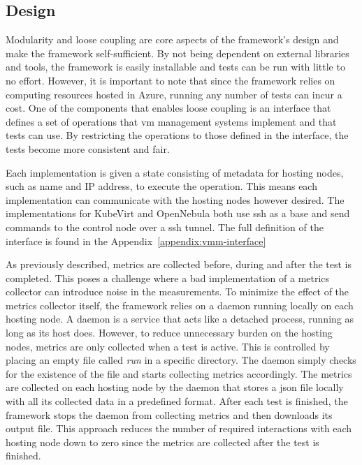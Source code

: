 \documentclass{kththesis}
\begin{document}
\subsection{Design}
\label{sec:framework-design}
Modularity and loose coupling are core aspects of the framework's design and make the framework self-sufficient. By not being dependent on external libraries and tools, the framework is easily installable and tests can be run with little to no effort. However, it is important to note that since the framework relies on computing resources hosted in Azure, running any number of tests can incur a cost. One of the components that enables loose coupling is an interface that defines a set of operations that \Gls{vm} management systems implement and that tests can use. By restricting the operations to those defined in the interface, the tests become more consistent and fair. 

Each implementation is given a state consisting of metadata for hosting nodes, such as name and IP address, to execute the operation. This means each implementation can communicate with the hosting nodes however desired. The implementations for KubeVirt and OpenNebula both use \Gls{ssh} as a base and send commands to the control node over a \Gls{ssh} tunnel. The full definition of the interface is found in the Appendix\ \ref{appendix:vmm-interface}

As previously described, metrics are collected before, during and after the test is completed. This poses a challenge where a bad implementation of a metrics collector can introduce noise in the measurements. To minimize the effect of the metrics collector itself, the framework relies on a daemon running locally on each hosting node. A daemon is a service that acts like a detached process, running as long as its host does. However, to reduce unnecessary burden on the hosting nodes, metrics are only collected when a test is active. This is controlled by placing an empty file called \textit{run} in a specific directory. The daemon simply checks for the existence of the file and starts collecting metrics accordingly. The metrics are collected on each hosting node by the daemon that stores a \Gls{json} file locally with all its collected data in a predefined format. After each test is finished, the framework stops the daemon from collecting metrics and then downloads its output file. This approach reduces the number of required interactions with each hosting node down to zero since the metrics are collected after the test is finished. 
\end{document}
